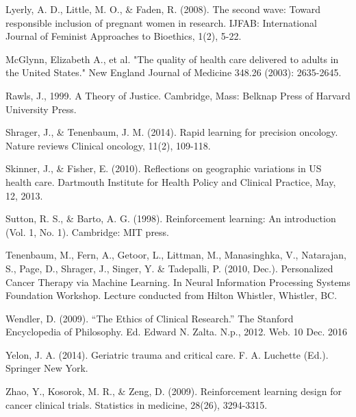 \documentclass[]{spie}  %
\begin{document}
\skiplinehalf

\noindent [21] Lyerly, A. D., Little, M. O., & Faden, R. (2008). The second wave: Toward responsible inclusion of pregnant women in research. IJFAB: International Journal of Feminist Approaches to Bioethics, 1(2), 5-22.

\skiplinehalf

\noindent [22] McGlynn, Elizabeth A., et al. "The quality of health care delivered to adults in the United States." New England Journal of Medicine 348.26 (2003): 2635-2645.

\skiplinehalf

\noindent [23] Rawls, J., 1999. A Theory of Justice. Cambridge, Mass: Belknap Press of Harvard University Press.

\skiplinehalf

\noindent [24] Shrager, J., & Tenenbaum, J. M. (2014). Rapid learning for precision oncology. Nature reviews Clinical oncology, 11(2), 109-118.

\skiplinehalf

\noindent [25] Skinner, J., & Fisher, E. (2010). Reflections on geographic variations in US health care. Dartmouth Institute for Health Policy and Clinical Practice, May, 12, 2013.

\skiplinehalf

\noindent [26] Sutton, R. S., & Barto, A. G. (1998). Reinforcement learning: An introduction (Vol. 1, No. 1). Cambridge: MIT press.

\skiplinehalf

\noindent [27] Tenenbaum, M., Fern, A., Getoor, L., Littman, M., Manasinghka, V., Natarajan, S., Page, D., Shrager, J., Singer, Y. & Tadepalli, P. (2010, Dec.). Personalized Cancer Therapy via Machine Learning. In Neural Information Processing Systems Foundation Workshop. Lecture conducted from Hilton Whistler, Whistler, BC.

\skiplinehalf

\noindent [28] Wendler, D. (2009). “The Ethics of Clinical Research.” The Stanford Encyclopedia of Philosophy. Ed. Edward N. Zalta. N.p., 2012. Web. 10 Dec. 2016

\skiplinehalf

\noindent [29] Yelon, J. A. (2014). Geriatric trauma and critical care. F. A. Luchette (Ed.). Springer New York.

\skiplinehalf

\noindent [30] Zhao, Y., Kosorok, M. R., & Zeng, D. (2009). Reinforcement learning design for cancer clinical trials. Statistics in medicine, 28(26), 3294-3315.
\end{document}
